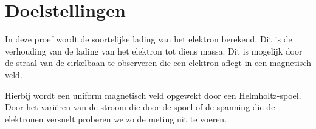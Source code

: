 \section{Doelstellingen}

In deze proef wordt de soortelijke lading van het elektron berekend. Dit is de 
verhouding van de lading van het elektron tot diens massa. Dit is mogelijk door 
de straal van de cirkelbaan te observeren die een elektron aflegt in een 
magnetisch veld. 

Hierbij wordt een uniform magnetisch veld opgewekt door een Helmholtz-spoel.  
Door het vari\"eren van de stroom die door de spoel of de spanning die de 
elektronen versnelt proberen we zo de meting uit te voeren.
